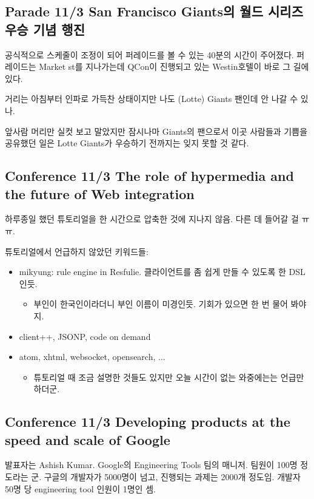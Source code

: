 \documentclass[a4paper]{article}
\begin{document}
\subsection{Parade 11/3 San Francisco Giants의 월드 시리즈 우승 기념 행진}
 
공식적으로 스케줄이 조정이 되어 퍼레이드를 볼 수 있는 40분의 시간이
주어졌다.  퍼레이드는 Market st를 지나가는데 QCon이 진행되고 있는
Westin호텔이 바로 그 길에 있다.
 
거리는 아침부터 인파로 가득찬 상태이지만 나도 (Lotte) Giants 팬인데 안
나갈 수 있나.
 
앞사람 머리만 실컷 보고 말았지만 잠시나마 Giants의 팬으로서 이곳
사람들과 기쁨을 공유했던 일은 Lotte Giants가 우승하기 전까지는 잊지
못할 것 같다.
 
\subsection{Conference 11/3 The role of hypermedia and the future of
  Web integration}
 
하루종일 했던 튜토리얼을 한 시간으로 압축한 것에 지나지 않음. 다른 데
들어갈 걸 ㅠㅠ.
 
튜토리얼에서 언급하지 않았던 키워드들:
\begin{itemize}
\item mikyung: rule engine in Resfulie. 클라이언트를 좀 쉽게 만들 수
  있도록 한 DSL인듯.
  \begin{itemize}
  \item 부인이 한국인이라더니 부인 이름이 미경인듯. 기회가 있으면 한 번
    물어 봐야지.
  \end{itemize}
\item client++, JSONP, code on demand
\item atom, xhtml, websocket, opensearch, ...
  \begin{itemize}
  \item 튜토리얼 때 조금 설명한 것들도 있지만 오늘 시간이 없는
    와중에는는 언급만 하더군.
  \end{itemize}
\end{itemize}
 
\subsection{Conference 11/3 Developing products at the speed and scale
  of Google}
 
발표자는 Ashish Kumar. Google의 Engineering Tools 팀의 매니저. 팀원이
100명 정도라는 군.  구글의 개발자가 5000명이 넘고, 진행되는 과제는
2000개 정도임. 개발자 50명 당 engineering tool 인원이 1명인 셈.
 
\end{document}
